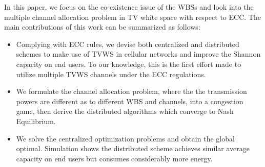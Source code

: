 \documentclass[times]{ettauth}
\theoremstyle{mytheoremstyle}
\theoremstyle{mytheoremstyle}
\theoremstyle{mytheoremstyle}
\begin{document}
In this paper, we focus on the co-existence issue of the WBSs and look into the multiple channel allocation problem in TV white space with respect to ECC.
The main contributions of this work can be summarized as follows:
\begin{itemize} 
\item Complying with ECC rules, we devise both centralized and distributed schemes to make use of TVWS in cellular networks and improve the Shannon capacity on end users.
To our knowledge, this is the first effort made to utilize multiple TVWS channels under the ECC regulations. 
\item We formulate the channel allocation problem, where the the transmission powers are different as to different WBS and channels, into a congestion game, then derive the distributed algorithms which converge to Nash Equilibrium. 
\item We solve the centralized optimization problems and obtain the global optimal.
Simulation shows the distributed scheme achieves similar average capacity on end users but consumes considerably more energy.

\end{itemize}





%
\end{document}
